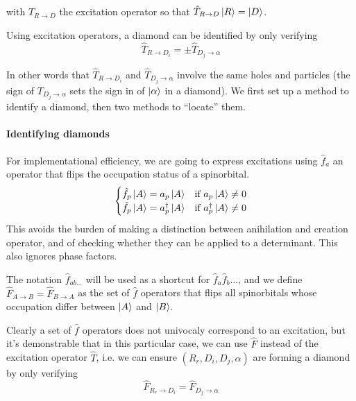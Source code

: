 \documentclass[./thesis.tex]{subfiles}
\begin{document}
with $\hat T_{R \rightarrow D}$ the excitation operator so that $\hat T_{R \rightarrow D} \ket R = \ket D$.



Using excitation operators, a diamond can be identified by only verifying
\begin{equation}
\hat T_{R \rightarrow D_i} = \pm \hat T_{D_j \rightarrow \alpha}
\label{eq:excitation_diamond}
\end{equation}

In other words that $\hat T_{R \rightarrow D_i}$ and $\hat T_{D_j \rightarrow \alpha}$ involve the same holes and particles (the sign of $T_{D_j \rightarrow \alpha}$ sets the sign in of ${\ket{\alpha}}$ in a diamond).
We first set up a method to identify a diamond, then two methods to ``locate'' them.


\paragraph{Identifying diamonds}
For implementational efficiency, we are going to express excitations using $\hat f_a$ an operator that flips the occupation status of a spinorbital.
\begin{align}
  \begin{cases}
  \hat f_p \ket A = a_p \ket A & \text{if }  a_p \ket A \neq 0\\
  \hat f_p \ket A = a^\dagger_p \ket A & \text{if }  a^\dagger_p  \ket A \neq 0\\
  \end{cases}
\end{align}
This avoids the burden of making a distinction between anihilation and creation operator, and of checking whether they can be applied to a determinant. This also ignores phase factors.


The notation $\hat f_{ab\ldots}$ will be used as a shortcut for $\hat f_a \hat f_b \ldots$, and we define $\hat F_{A \rightarrow B} = \hat F_{B \rightarrow A}$ as the set of $\hat f$ operators that flips all spinorbitals whose occupation differ between $\ket A$ and $\ket B$.

Clearly a set of $\hat f$ operators does not univocaly correspond to an excitation, but it's demonstrable that in this particular case, we can use $\hat F$ instead of the excitation operator $\hat T$, i.e. we can ensure $(R_r, D_i, D_j, \alpha)$ are forming a diamond by only verifying
\begin{equation}
\hat F_{R_r \rightarrow D_i} = \hat F_{D_j \rightarrow \alpha}
\label{eq:diamond_flip}
\end{equation}
\end{document}
